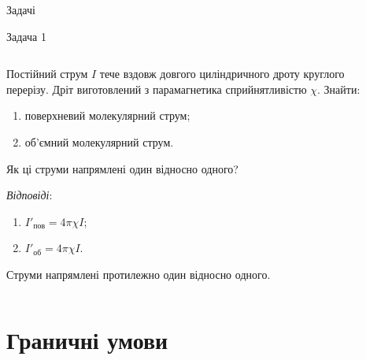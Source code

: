 \documentclass[onlytextwidth]{beamer}
\begin{document}
\begin{frame}{Задачі}{}
	\begin{exampleblock}{\scriptsize Задача 1}
		\begin{columns}
			\begin{column}{0.75\linewidth}\justifying\scriptsize
				Постійний струм $I$ тече вздовж довгого циліндричного дроту круглого перерізу. Дріт виготовлений з парамагнетика сприйнятливістю $\chi$.
				Знайти:
				\begin{enumerate}
					\item поверхневий молекулярний струм;
					\item об'ємний молекулярний струм.
				\end{enumerate}
				Як ці струми напрямлені один відносно одного?
				\bigskip

				\textit{Відповіді}:

				\begin{enumerate}
					\item $I'_\text{пов} = 4\pi\chi I$;
					\item $I'_\text{об} = 4\pi\chi I$.
				\end{enumerate}
				Струми напрямлені протилежно один відносно одного.

			\end{column}
			\begin{column}{0.25\linewidth}\centering
				
			\end{column}
		\end{columns}

	\end{exampleblock}
\end{frame}






\section{Граничні умови}
\end{document}
